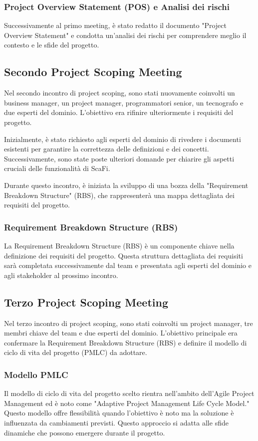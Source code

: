 \subsubsection{Project Overview Statement (POS) e Analisi dei rischi}
Successivamente al primo meeting, è stato redatto il documento "Project Overview Statement" e condotta un'analisi dei rischi per comprendere meglio il contesto e le sfide del progetto.

\subsection{Secondo Project Scoping Meeting}
Nel secondo incontro di project scoping, sono stati nuovamente coinvolti un business manager, un project manager, programmatori senior, un tecnografo e due esperti del dominio. L'obiettivo era rifinire ulteriormente i requisiti del progetto.

Inizialmente, è stato richiesto agli esperti del dominio di rivedere i documenti esistenti per garantire la correttezza delle definizioni e dei concetti. Successivamente, sono state poste ulteriori domande per chiarire gli aspetti cruciali delle funzionalità di ScaFi.

Durante questo incontro, è iniziata la sviluppo di una bozza della "Requirement Breakdown Structure" (RBS), che rappresenterà una mappa dettagliata dei requisiti del progetto.

\subsubsection{Requirement Breakdown Structure (RBS)}
La Requirement Breakdown Structure (RBS) è un componente chiave nella definizione dei requisiti del progetto. Questa struttura dettagliata dei requisiti sarà completata successivamente dal team e presentata agli esperti del dominio e agli stakeholder al prossimo incontro.

\subsection{Terzo Project Scoping Meeting}
Nel terzo incontro di project scoping, sono stati coinvolti un project manager, tre membri chiave del team e due esperti del dominio. L'obiettivo principale era confermare la Requirement Breakdown Structure (RBS) e definire il modello di ciclo di vita del progetto (PMLC) da adottare.

\subsubsection{Modello PMLC}
Il modello di ciclo di vita del progetto scelto rientra nell'ambito dell'Agile Project Management ed è noto come "Adaptive Project Management Life Cycle Model." Questo modello offre flessibilità quando l'obiettivo è noto ma la soluzione è influenzata da cambiamenti previsti. Questo approccio si adatta alle sfide dinamiche che possono emergere durante il progetto.

